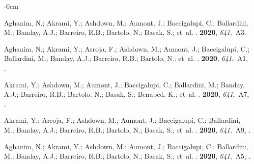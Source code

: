 \documentclass[universe,article,accept,moreauthors,pdftex]{Definitions/mdpi}
\begin{document}
\begin{adjustwidth}{-\extralength}{0cm}
\begin{thebibliography}{999}
Aghanim, N.; Akrami, Y.; Ashdown, M.; Aumont, J.; Baccigalupi, C.; Ballardini, M.; Banday, A.J.; Barreiro, R.B.; Bartolo, N.; Basak, S.;  et~al.
.
 {\bf 2020}, {\em 641},~A3.

Aghanim, N.; Akrami, Y.; Arroja, F.; Ashdown, M.; Aumont, J.; Baccigalupi, C.; Ballardini, M.; Banday, A.J.; Barreiro, R.B.; Bartolo, N.;  et~al.
.
 {\bf 2020}, {\em 641},~A1,
{\href{https://doi.org/10.1051/0004-6361/201833880}{}}.

Akrami, Y.; Ashdown, M.; Aumont, J.; Baccigalupi, C.; Ballardini, M.; Banday, A.J.; Barreiro, R.B.; Bartolo, N.; Basak, S.; Benabed, K.;  et~al.
.
 {\bf 2020}, {\em 641},~A7,
{\href{https://doi.org/10.1051/0004-6361/201935201}{}}.

Akrami, Y.; Arroja, F.; Ashdown, M.; Aumont, J.; Baccigalupi, C.; Ballardini, M.; Banday, A.J.; Barreiro, R.B.; Bartolo, N.; Basak, S.;  et~al.
.
 {\bf 2020}, {\em 641},~A9,
{\href{https://doi.org/10.1051/0004-6361/201935891}{}}.

Aghanim, N.; Akrami, Y.; Ashdown, M.; Aumont, J.; Baccigalupi, C.; Ballardini, M.; Banday, A.J.; Barreiro, R.B.; Bartolo, N.; Basak, S.;  et~al.
.
 {\bf 2020}, {\em 641},~A5,
{\href{https://doi.org/10.1051/0004-6361/201936386}{}}.


\end{thebibliography}
\end{adjustwidth}
\end{document}
